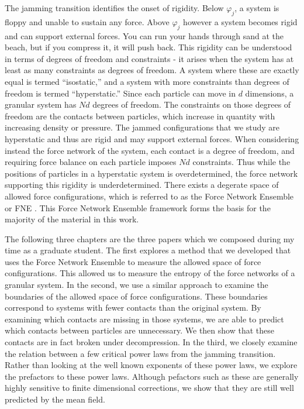The jamming transition identifies the onset of rigidity. Below $\varphi_j$, a system is floppy and unable to sustain any force. Above $\varphi_j$ however a system becomes rigid and can support external forces. You can run your hands through sand at the beach, but if you compress it, it will push back. This rigidity can be understood in terms of degrees of freedom and constraints - it arises when the system has at least as many constraints as degrees of freedom. A system where these are exactly equal is termed  ``isostatic,'' and a system with more constraints than degrees of freedom is termed ``hyperstatic.'' Since each particle can move in $d$ dimensions, a granular system has $Nd$ degrees of freedom. The constraints on those degrees of freedom are the contacts between particles, which increase in quantity with increasing density or pressure. The jammed configurations that we study are hyperstatic and thus are rigid and may support external forces. When considering instead the force network of the system, each contact is a degree of freedom, and requiring force balance on each particle imposes $Nd$ constraints. Thus while the positions of particles in a hyperstatic system is overdetermined, the force network supporting this rigidity is underdetermined. There exists a degerate space of allowed force configurations, which is referred to as the Force Network Ensemble or FNE \cite{snoeijer_force_2004,tighe_force_2010}. This Force Network Ensemble framework forms the basis for the majority of the material in this work.




The following three chapters are the three papers which we composed during my time as a graduate student. The first explores a method that we developed that uses the Force Network Ensemble to measure the allowed space of force configurations. This allowed us to measure the entropy of the force networks of a granular system. In the second, we use a similar approach to examine the boundaries of the allowed space of force configurations. These boundaries correspond to systems with fewer contacts than the original system. By examining which contacts are missing in those systems, we are able to predict which contacts between particles are unnecessary. We then show that these contacts are in fact broken under decompression. In the third, we closely examine the relation between a few critical power laws from the jamming transition. Rather than looking at the well known exponents of these power laws, we explore the prefactors to these power laws. Although pefactors such as these are generally highly sensitive to finite dimensional corrections, we show that they are still well predicted by the mean field.
